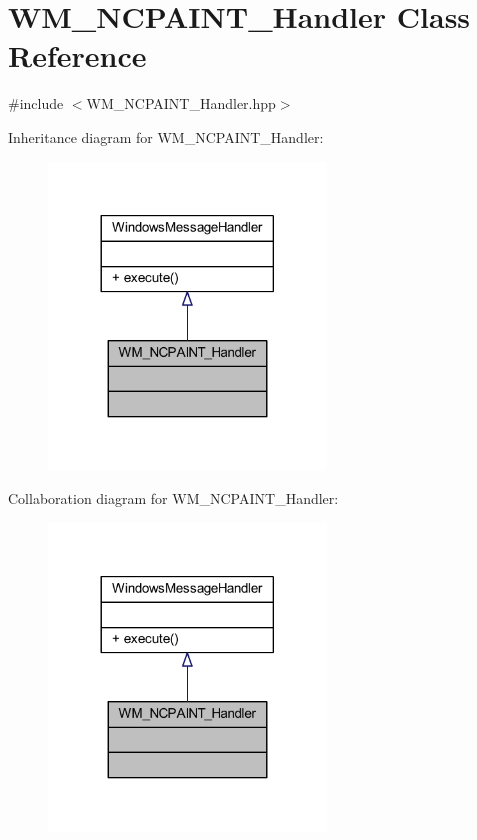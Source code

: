 \hypertarget{class_w_m___n_c_p_a_i_n_t___handler}{}\section{W\+M\+\_\+\+N\+C\+P\+A\+I\+N\+T\+\_\+\+Handler Class Reference}
\label{class_w_m___n_c_p_a_i_n_t___handler}


{\ttfamily \#include $<$W\+M\+\_\+\+N\+C\+P\+A\+I\+N\+T\+\_\+\+Handler.\+hpp$>$}



Inheritance diagram for W\+M\+\_\+\+N\+C\+P\+A\+I\+N\+T\+\_\+\+Handler\+:\nopagebreak
\begin{figure}[H]
\begin{center}
\leavevmode
\includegraphics[width=209pt]{class_w_m___n_c_p_a_i_n_t___handler__inherit__graph}
\end{center}
\end{figure}


Collaboration diagram for W\+M\+\_\+\+N\+C\+P\+A\+I\+N\+T\+\_\+\+Handler\+:\nopagebreak
\begin{figure}[H]
\begin{center}
\leavevmode
\includegraphics[width=209pt]{class_w_m___n_c_p_a_i_n_t___handler__coll__graph}
\end{center}
\end{figure}
